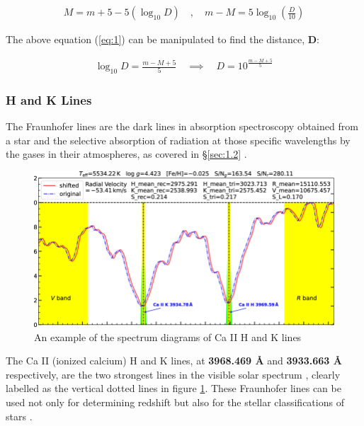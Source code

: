 \documentclass[12pt]{article}
\begin{document}
\begin{gather} \label{eq:1}
    M = m + 5 - 5 (\log_{10} D) \quad , \quad m - M = 5 \log_{10} \left( \frac{D}{10} \right)
\end{gather}

The above equation (\ref{eq:1}) can be manipulated to find the distance, \textbf{D}:

\begin{gather} \label{eq:2}
    \log_{10}D = \frac{m - M + 5}{5} \quad \implies \quad D = 10^{\frac{m - M + 5}{5}}
\end{gather}

\subsubsection{H and K Lines} \label{sec:1.2.2}

The Fraunhofer lines are the dark lines in absorption spectroscopy obtained from a star and the selective absorption of radiation at those specific wavelengths
by the gases in their atmospheres, as covered in §\ref{sec:1.2}
\cite{brithk}.

\begin{figure}[H]
    \centering
    \includegraphics[width=15cm]{handklines.png}
    \caption{\centering \footnotesize{An example of the spectrum diagrams of Ca II H and K lines \protect\cite{rgatehk}}}
    \label{fig:hklines}
\end{figure}

The Ca II (ionized calcium) H and K lines, at \textbf{3968.469 Å} and \textbf{3933.663 Å} respectively, are the two strongest lines in the visible solar spectrum
\cite{UCDhubble,aandahk}, clearly labelled as the vertical dotted lines in figure \ref{fig:hklines}.
These Fraunhofer lines can be used not only for determining redshift but also for the stellar classifications of stars
\cite{britstar}.
\end{document}
